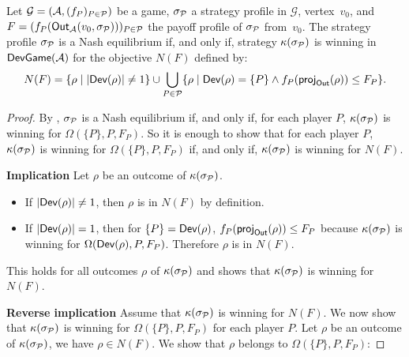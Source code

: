 \begin{theorem}\label{14-thm:dev-nash}
  Let \(\mathcal{G} = (\mathcal{A}, (f_P)_{P \in \mathcal{P}})\) be a game, \(\sigma_{\mathcal{P}}\) a strategy
  profile in \(\mathcal{G}\), vertex~$v_0$, and \(F = (f_P(\textsf{Out}_{\mathcal{A}}(v_0,\sigma_{\mathcal{P}})))_{P\in \mathcal{P}}\)
  the payoff
  profile of \(\sigma_{\mathcal{P}}\) from~$v_0$. The strategy profile \(\sigma_{\mathcal{P}}\) is a
  Nash equilibrium if, and only if, strategy \(\kappa(\sigma_{\mathcal{P}})\) is
  winning in \(\textsf{DevGame}(\mathcal{A})\) for the objective \(N(F)\) defined by:
  \[N(F) = \{\rho \mid |\textsf{Dev}(\rho)| \ne 1\}
    \cup \bigcup_{P\in \mathcal{P}} \{\rho \mid \textsf{Dev}(\rho) = \{P\}
    \land f_P(\textsf{proj}_{\textsf{Out}}(\rho)) \le F_P\}.\]
\end{theorem}
\begin{proof} By , \(\sigma_{\mathcal{P}}\) is a Nash
  equilibrium if, and only if, for each player \(P\),
  \(\kappa(\sigma_{\mathcal{P}})\) is winning for
  \(\Omega(\{P\}, P, F_P)\).
  So it is enough to show that for each player \(P\),
  \(\kappa(\sigma_{\mathcal{P}})\) is winning for
  \(\Omega(\{P\},P, F_P)\) if,
  and only if, \(\kappa(\sigma_{\mathcal{P}})\) is winning for \(N(F)\).

  \textbf{Implication} Let \(\rho\) be an outcome of
  \(\kappa(\sigma_{\mathcal{P}})\).

\begin{itemize}

\item
  If \(|\textsf{Dev}(\rho)| \ne 1\), then \(\rho\) is in \(N(F)\) by
  definition.
\item
  If \(|\textsf{Dev}(\rho)| = 1\), then for \(\{P\} = \textsf{Dev}(\rho)\),
  \(f_P(\textsf{proj}_{\textsf{Out}}(\rho)) \leq F_P\) because
  \(\kappa(\sigma_{\mathcal{P}})\) is winning for
  \(\Omega(\textsf{Dev}(\rho), P, F_P)\). Therefore \(\rho\) is
  in \(N(F)\).
\end{itemize}

This holds for all outcomes \(\rho\) of \(\kappa(\sigma_{\mathcal{P}})\) and shows
that \(\kappa(\sigma_{\mathcal{P}})\) is winning for \(N(F)\).

\textbf{Reverse implication} %
Assume that
\(\kappa(\sigma_{\mathcal{P}})\) is winning for \(N(F)\). We now show that
\(\kappa(\sigma_{\mathcal{P}})\) is winning for
\(\Omega(\{P\},P, F_P)\) for each player \(P\). Let
\(\rho\) be an outcome of \(\kappa(\sigma_{\mathcal{P}})\), we have
\(\rho \in N(F)\). We show that \(\rho\) belongs to
\(\Omega(\{P\}, P, F_P)\):


\end{proof}
